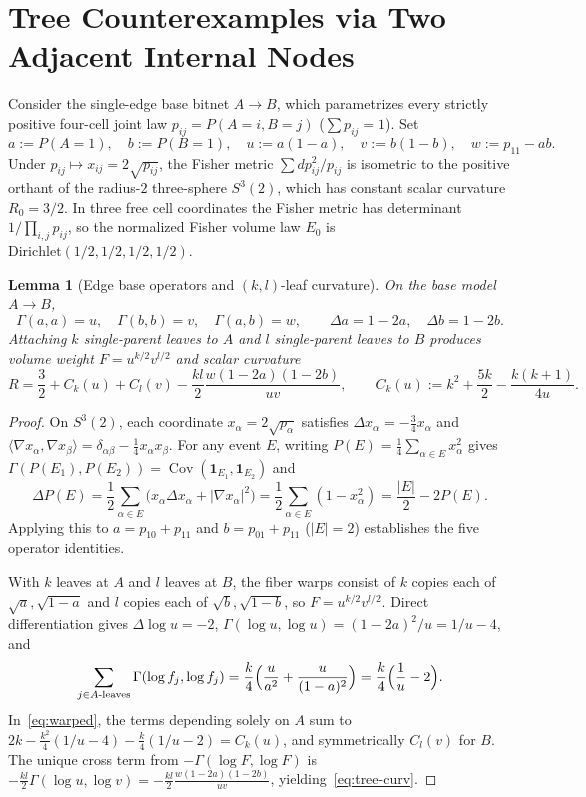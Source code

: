 \documentclass[11pt]{article}
\theoremstyle{plain}
\newtheorem{lemma}[theorem]{Lemma}
\theoremstyle{definition}
\theoremstyle{remark}
\DeclareMathOperator{\Cov}{Cov}
\begin{document}
\section{Tree Counterexamples via Two Adjacent Internal Nodes}

Consider the single-edge base bitnet $A \to B$, which parametrizes every strictly positive four-cell joint law $p_{ij} = P(A=i, B=j)$ ($\sum p_{ij} = 1$). Set
\[
a := P(A=1), \quad b := P(B=1), \quad u := a(1-a), \quad v := b(1-b), \quad w := p_{11} - ab.
\]
Under $p_{ij} \mapsto x_{ij} = 2\sqrt{p_{ij}}$, the Fisher metric $\sum dp_{ij}^2 / p_{ij}$ is isometric to the positive orthant of the radius-$2$ three-sphere $S^3(2)$, which has constant scalar curvature $R_0 = 3/2$. In three free cell coordinates the Fisher metric has determinant $1/\prod_{i,j} p_{ij}$, so the normalized Fisher volume law $E_0$ is $\mathrm{Dirichlet}(1/2, 1/2, 1/2, 1/2)$.

\begin{lemma}[Edge base operators and $(k, l)$-leaf curvature]\label{lem:edge}
On the base model $A \to B$,
\[
\Gamma(a, a) = u, \quad \Gamma(b, b) = v, \quad \Gamma(a, b) = w, \qquad \Delta a = 1 - 2a, \quad \Delta b = 1 - 2b.
\]
Attaching $k$ single-parent leaves to $A$ and $l$ single-parent leaves to $B$ produces volume weight $F = u^{k/2} v^{l/2}$ and scalar curvature
\begin{equation}\label{eq:tree-curv}
R = \frac{3}{2} + C_k(u) + C_l(v) - \frac{kl}{2}\frac{w(1-2a)(1-2b)}{uv},
\qquad C_k(u) := k^2 + \frac{5k}{2} - \frac{k(k+1)}{4u}.
\end{equation}
\end{lemma}

\begin{proof}
On $S^3(2)$, each coordinate $x_\alpha = 2\sqrt{p_\alpha}$ satisfies $\Delta x_\alpha = -\frac{3}{4} x_\alpha$ and $\langle \nabla x_\alpha, \nabla x_\beta \rangle = \delta_{\alpha\beta} - \frac{1}{4} x_\alpha x_\beta$. For any event $E$, writing $P(E) = \frac{1}{4}\sum_{\alpha \in E} x_\alpha^2$ gives $\Gamma(P(E_1), P(E_2)) = \Cov(\mathbf{1}_{E_1}, \mathbf{1}_{E_2})$ and
\[
\Delta P(E) = \frac{1}{2}\sum_{\alpha \in E}\bigl(x_\alpha \Delta x_\alpha + |\nabla x_\alpha|^2\bigr)
= \frac{1}{2}\sum_{\alpha \in E}(1 - x_\alpha^2) = \frac{|E|}{2} - 2P(E).
\]
Applying this to $a = p_{10} + p_{11}$ and $b = p_{01} + p_{11}$ ($|E| = 2$) establishes the five operator identities.

With $k$ leaves at $A$ and $l$ leaves at $B$, the fiber warps consist of $k$ copies each of $\sqrt{a}, \sqrt{1-a}$ and $l$ copies each of $\sqrt{b}, \sqrt{1-b}$, so $F = u^{k/2} v^{l/2}$. Direct differentiation gives $\Delta\log u = -2$, $\Gamma(\log u, \log u) = (1-2a)^2/u = 1/u - 4$, and
\[
\sum_{j \in A\text{-leaves}} \Gamma(\log f_j, \log f_j) = \frac{k}{4}\Bigl(\frac{u}{a^2} + \frac{u}{(1-a)^2}\Bigr) = \frac{k}{4}\Bigl(\frac{1}{u} - 2\Bigr).
\]
In~\eqref{eq:warped}, the terms depending solely on $A$ sum to $2k - \frac{k^2}{4}(1/u - 4) - \frac{k}{4}(1/u - 2) = C_k(u)$, and symmetrically $C_l(v)$ for $B$. The unique cross term from $-\Gamma(\log F, \log F)$ is $-\frac{kl}{2}\Gamma(\log u, \log v) = -\frac{kl}{2}\frac{w(1-2a)(1-2b)}{uv}$, yielding~\eqref{eq:tree-curv}.
\end{proof}
\end{document}
